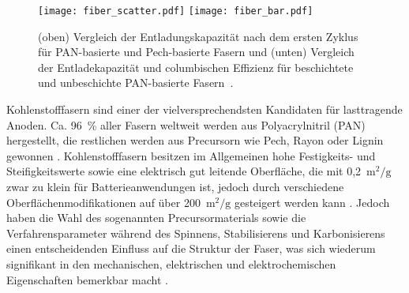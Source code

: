 

\begin{figure}[!h]
        \center
		\texttt{[image: fiber\_scatter.pdf]}
		\texttt{[image: fiber\_bar.pdf]}
		\caption{\label{fig:fiber_comp}(oben) Vergleich der Entladungskapazität nach dem ersten Zyklus für PAN-basierte und Pech-basierte Fasern und (unten) Vergleich der Entladekapazität und columbischen Effizienz für beschichtete und unbeschichte PAN-basierte Fasern~\cite{Kjell2011,Snyder2009a,Hagberg2016,Ye2024}.}
\end{figure}
Kohlenstofffasern sind einer der vielversprechendsten Kandidaten für lasttragende Anoden. Ca. 96~\% aller Fasern weltweit werden aus Polyacrylnitril (PAN) hergestellt, die restlichen werden aus Precursorn wie Pech, Rayon oder Lignin gewonnen \cite{Das2016}. Kohlenstofffasern besitzen im Allgemeinen hohe Festigkeits- und Steifigkeitswerte sowie eine elektrisch gut leitende Oberfläche, die mit 0,2~$\si{\metre\squared\per\g}$ zwar zu klein für Batterieanwendungen ist, jedoch durch verschiedene Oberflächenmodifikationen \cite{Qian2013,Senokos2023} auf über 200~$\si{\metre\squared\per\g}$ gesteigert werden kann \cite{Zenkert2024}. Jedoch haben die Wahl des sogenannten Precursormaterials sowie die Verfahrensparameter während des Spinnens, Stabilisierens und Karbonisierens einen entscheidenden Einfluss auf die Struktur der Faser, was sich wiederum signifikant in den mechanischen, elektrischen und elektrochemischen Eigenschaften bemerkbar macht \cite{Newcomb2015}.

